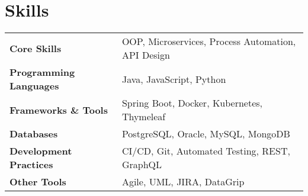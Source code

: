 \section{\textbf{Skills}}
\begin{tabularx}{\linewidth}{@{}l X@{}}
    \textbf{Core Skills} & \normalsize{OOP, Microservices, Process Automation, API Design} \\
    \textbf{Programming Languages} & \normalsize{Java, JavaScript, Python} \\
    \textbf{Frameworks \& Tools} & \normalsize{Spring Boot, Docker, Kubernetes, Thymeleaf} \\
    \textbf{Databases} & \normalsize{PostgreSQL, Oracle, MySQL, MongoDB} \\
    \textbf{Development Practices} & \normalsize{CI/CD, Git, Automated Testing, REST, GraphQL} \\
    \textbf{Other Tools} & \normalsize{Agile, UML, JIRA, DataGrip} \\
\end{tabularx}

